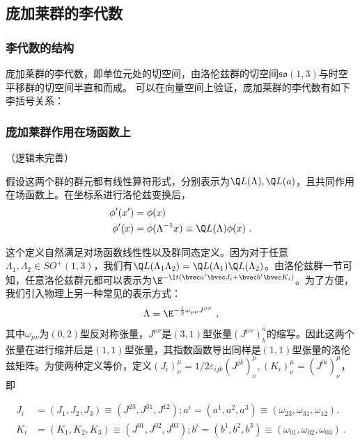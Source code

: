 \subsection{庞加莱群的李代数}
\subsubsection{李代数的结构}
庞加莱群的李代数，即单位元处的切空间，由洛伦兹群的切空间$\mathfrak {so}(1,3)$与时空平移群的切空间半直和而成。
可以在向量空间上验证，庞加莱群的李代数有如下李括号关系：

\subsubsection{庞加莱群作用在场函数上}
（逻辑未完善）

假设这两个群的群元都有线性算符形式，分别表示为$\Q L(\Lambda),\Q L(a)$，且共同作用在场函数上。在坐标系进行洛伦兹变换后，
\begin{equation}\label{eq_PoinGr_1}
\begin{aligned}
\phi'(x')&=\phi(x)\\
\phi'(x)&=\phi(\Lambda^{-1}x)\equiv \Q L(\Lambda)\phi(x)~.
\end{aligned}
\end{equation}

这个定义自然满足对场函数线性性以及群同态定义。因为对于任意$\Lambda_1,\Lambda_2\in SO^+(1,3)$，我们有$\Q L(\Lambda_1\Lambda_2)=\Q L(\Lambda_1)\Q L(\Lambda_2)$。由洛伦兹群一节可知，任意洛伦兹群元都可以表示为$\E^{-\I t(\bvec a^i\bvec J_i+\bvec b^i\bvec K_i)}$。为了方便，我们引入物理上另一种常见的表示方式：
\begin{equation}
\Lambda=\E^{-\frac{i}{2} \omega_{\mu \nu} J^{\mu \nu}}
~,
\end{equation}
其中$\omega_{\mu\nu}$为$(0,2)$型反对称张量，$J^{\mu\nu}$是$(3,1)$型张量$(J^{\mu\nu})^a_b$的缩写。因此这两个张量在进行缩并后是$(1,1)$型张量，其指数函数导出同样是$(1,1)$型张量的洛伦兹矩阵。为使两种定义等价，定义$(J_i)^{\mu}_{\nu}=1/2\varepsilon_{ijk}(J^{jk})^{\mu}_{\nu},(K_i)^{\mu}_{\nu}=(J^{0i})^{\mu}_{\nu}$，即

\begin{equation}\label{eq_PoinGr_2}
\begin{aligned}
J_i&=(J_1,J_2,J_3)\equiv(J^{23},J^{31},J^{12});a^i=(a^1,a^2,a^3)\equiv(\omega_{23},\omega_{31},\omega_{12}).\\
K_i&=(K_1,K_2,K_3)\equiv(J^{01},J^{02},J^{03});b^i=(b^1,b^2,b^3)\equiv(\omega_{01},\omega_{02},\omega_{03})~.
\end{aligned}
\end{equation}

